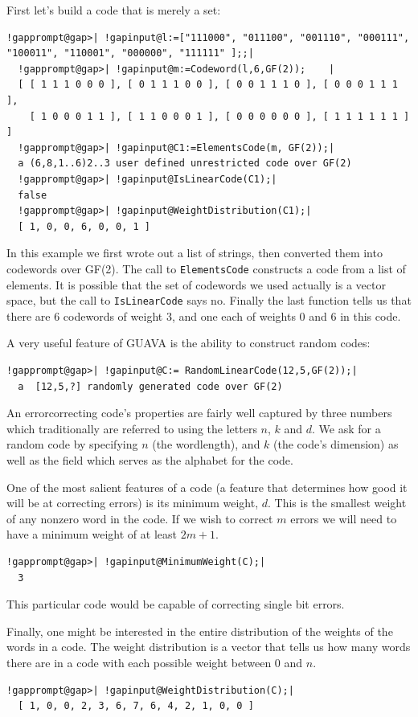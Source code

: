 \documentclass[a4paper,11pt]{report}
\begin{document}
{{ First let's build a code that is merely a set: 
\begin{Verbatim}[commandchars=!@|,fontsize=\small,frame=single,label=Example]
  !gapprompt@gap>| !gapinput@l:=["111000", "011100", "001110", "000111", "100011", "110001", "000000", "111111" ];;|
  !gapprompt@gap>| !gapinput@m:=Codeword(l,6,GF(2));    |
  [ [ 1 1 1 0 0 0 ], [ 0 1 1 1 0 0 ], [ 0 0 1 1 1 0 ], [ 0 0 0 1 1 1 ], 
    [ 1 0 0 0 1 1 ], [ 1 1 0 0 0 1 ], [ 0 0 0 0 0 0 ], [ 1 1 1 1 1 1 ] ]
  !gapprompt@gap>| !gapinput@C1:=ElementsCode(m, GF(2));|
  a (6,8,1..6)2..3 user defined unrestricted code over GF(2)
  !gapprompt@gap>| !gapinput@IsLinearCode(C1);|
  false
  !gapprompt@gap>| !gapinput@WeightDistribution(C1);|
  [ 1, 0, 0, 6, 0, 0, 1 ]
\end{Verbatim}
 

 In this example we first wrote out a list of strings, then converted them into
codewords over GF(2). The call to \texttt{ElementsCode} constructs a code from a list of elements. It is possible that the set of
codewords we used actually is a vector space, but the call to \texttt{IsLinearCode} says no. Finally the last function tells us that there are 6 codewords of
weight 3, and one each of weights 0 and 6 in this code. 

 A very useful feature of \textsf{GUAVA} is the ability to construct random codes: 
\begin{Verbatim}[commandchars=!@|,fontsize=\small,frame=single,label=Example]
  !gapprompt@gap>| !gapinput@C:= RandomLinearCode(12,5,GF(2));|
  a  [12,5,?] randomly generated code over GF(2)
\end{Verbatim}
 

 An error\texttt{}correcting code's properties are fairly well
captured by three numbers which traditionally are referred to using the
letters $n$, $k$ and $d$. We ask for a random code by specifying $n$ (the wordlength), and $k$ (the code's dimension) as well as the field which serves as the alphabet for
the code. 

 One of the most salient features of a code (a feature that determines how good
it will be at correcting errors) is its minimum weight, $d$. This is the smallest weight of any nonzero word in the code. If we wish to
correct $m$ errors we will need to have a minimum weight of at least $2m+1$. 
\begin{Verbatim}[commandchars=!@|,fontsize=\small,frame=single,label=Example]
  !gapprompt@gap>| !gapinput@MinimumWeight(C);|
  3
\end{Verbatim}
 

 This particular code would be capable of correcting single bit errors. 

 Finally, one might be interested in the entire distribution of the weights of
the words in a code. The weight distribution is a vector that tells us how
many words there are in a code with each possible weight between $0$ and $n$. 
\begin{Verbatim}[commandchars=!@|,fontsize=\small,frame=single,label=Example]
  !gapprompt@gap>| !gapinput@WeightDistribution(C);|
  [ 1, 0, 0, 2, 3, 6, 7, 6, 4, 2, 1, 0, 0 ]
\end{Verbatim}
 }

 }
\end{document}
